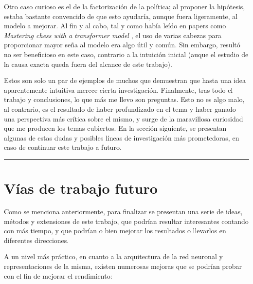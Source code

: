 \documentclass[12pt, a4paper]{article}
\let\cite\supercite
\begin{document}
Otro caso curioso es el de la factorización de la política; al proponer la hipótesis, estaba bastante convencido de que esto ayudaría, aunque fuera ligeramente, al modelo a mejorar. Al fin y al cabo, tal y como había leído en papers como \textit{Mastering chess with a transformer model} \cite{monroe2024masteringchesstransformermodel}, el uso de varias cabezas para proporcionar mayor seña al modelo era algo útil y común. Sin embargo, resultó no ser beneficioso en este caso, contrario a la intuición inicial (auque el estudio de la causa exacta queda fuera del alcance de este trabajo).

Estos son solo un par de ejemplos de muchos que demuestran que hasta una idea aparentemente intuitiva merece cierta investigación. Finalmente, tras todo el trabajo y conclusiones, lo que más me llevo son preguntas. Esto no es algo malo, al contrario, es el resultado de haber profundizado en el tema y haber ganado una perspectiva más crítica sobre el mismo, y surge de la maravillosa curiosidad que me producen los temas cubiertos. En la sección siguiente, se presentan algunas de estas dudas y posibles líneas de investigación más prometedoras, en caso de continuar este trabajo a futuro.

\rule{\textwidth}{0.2pt}
\section{Vías de trabajo futuro}\label{sec:futuro}

Como se menciona anteriormente, para finalizar se presentan una serie de ideas, métodos y extensiones de este trabajo, que podrían resultar interesantes contando con más tiempo, y que podrían o bien mejorar los resultados o llevarlos en diferentes direcciones.

A un nivel más práctico, en cuanto a la arquitectura de la red neuronal y representaciones de la misma, existen numerosas mejoras que se podrían probar con el fin de mejorar el rendimiento:
\end{document}
